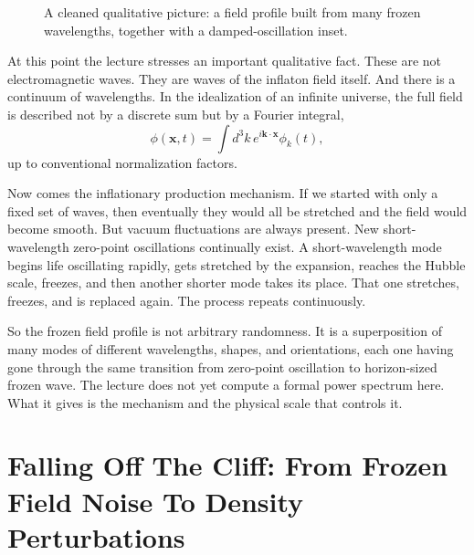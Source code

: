 \begin{figure}[htbp]
\centering
{}
\caption{A cleaned qualitative picture: a field profile built from many frozen wavelengths, together with a damped-oscillation inset.}
\end{figure}

At this point the lecture stresses an important qualitative fact. These are not electromagnetic waves. They are waves of the inflaton field itself. And there is a continuum of wavelengths. In the idealization of an infinite universe, the full field is described not by a discrete sum but by a Fourier integral,
\begin{equation}
\phi(\mathbf{x},t)=\int d^{3}k\, e^{i\mathbf{k}\cdot\mathbf{x}}\phi_k(t),
\end{equation}
up to conventional normalization factors.

Now comes the inflationary production mechanism. If we started with only a fixed set of waves, then eventually they would all be stretched and the field would become smooth. But vacuum fluctuations are always present. New short-wavelength zero-point oscillations continually exist. A short-wavelength mode begins life oscillating rapidly, gets stretched by the expansion, reaches the Hubble scale, freezes, and then another shorter mode takes its place. That one stretches, freezes, and is replaced again. The process repeats continuously.

So the frozen field profile is not arbitrary randomness. It is a superposition of many modes of different wavelengths, shapes, and orientations, each one having gone through the same transition from zero-point oscillation to horizon-sized frozen wave. The lecture does not yet compute a formal power spectrum here. What it gives is the mechanism and the physical scale that controls it.

\section{Falling Off The Cliff: From Frozen Field Noise To Density Perturbations}

